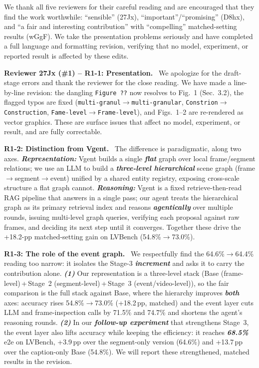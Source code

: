 \documentclass[10pt,twocolumn]{article}
\newcommand{\rvcolor}{rvR1}
\newcommand{\pt}[1]{\textbf{\textcolor{\rvcolor}{#1}}\ }
\newcommand{\rv}[1]{\vspace{1.5pt}\pt{#1}}
\renewcommand{\emph}[1]{\textbf{\textit{#1}}}
\begin{document}
\small
\linenumbers

We thank all five reviewers for their careful reading and are encouraged that
they find the work worthwhile: ``sensible'' (27Jx), ``important''/``promising''
(D8hx), and ``a fair and interesting contribution'' with ``compelling''
matched-setting results (wGgF). We take the presentation problems seriously and
have completed a full language and formatting revision, verifying that no model,
experiment, or reported result is affected by these edits.

\rv{Reviewer 27Jx (\#1) -- R1-1: Presentation.} We apologize for the draft-stage errors
and thank the reviewer for the close reading. We have made a line-by-line revision: the
dangling \texttt{Figure ??} now resolves to Fig.~1 (Sec.~3.2), the flagged typos are fixed
(\texttt{multi-granul}$\to$\texttt{multi-granular}, \texttt{Constrion}$\to$\texttt{Construction},
\texttt{Fame-level}$\to$\texttt{Frame-level}), and Figs.~1--2 are re-rendered as vector
graphics. These are surface issues that affect no model, experiment, or result, and are
fully correctable.

\pt{R1-2: Distinction from Vgent.} The difference is paradigmatic, along two axes.
\emph{Representation:} Vgent builds a single \emph{flat} graph over local frame/segment
relations; we use an LLM to build a \emph{three-level hierarchical} scene graph
(frame$\to$segment$\to$event) unified by a shared entity registry, exposing cross-scale
structure a flat graph cannot. \emph{Reasoning:} Vgent is a fixed retrieve-then-read RAG
pipeline that answers in a single pass; our agent treats the hierarchical graph as its
primary retrieval index and reasons \emph{agentically} over multiple rounds, issuing
multi-level graph queries, verifying each proposal against raw frames, and deciding its
next step until it converges. Together these
drive the +18.2-pp matched-setting gain on LVBench (54.8\%$\to$73.0\%).

\pt{R1-3: The role of the event graph.} We respectfully find the 64.6\%$\to$64.4\%
reading too narrow: it isolates the Stage-3 \emph{increment} and asks it to carry the
contribution alone. \emph{(1)} Our representation is a three-level stack (Base (frame-level)\,+\,Stage~2 (segment-level)\,+\,Stage~3 (event/video-level)),
so the fair comparison is the full stack against Base, where the hierarchy improves
\emph{both} axes: accuracy rises 54.8\%$\to$73.0\% (+18.2\,pp, matched) and the
event layer cuts LLM and frame-inspection calls by 71.5\% and 74.7\% and shortens the
agent's reasoning rounds.
\emph{(2)} In our \emph{follow-up experiment} that strengthens Stage~3, the event layer also lifts accuracy while keeping the efficiency: it reaches \emph{68.5\%} e2e on LVBench, +3.9\,pp over the
segment-only version (64.6\%) and +13.7\,pp over the caption-only Base (54.8\%). We will report these strengthened, matched results in the revision.
\end{document}
